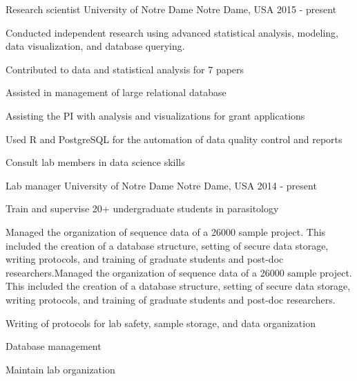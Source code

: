 
\begin{cventries}

  \cventry
    {Research scientist} %
    {University of Notre Dame} %
    {Notre Dame, USA} %
    {2015 - present} %
    {
      \begin{cvitems} %
        \item Conducted independent research using advanced statistical analysis, modeling, data visualization, and database querying. 
        \item Contributed to data and statistical analysis for 7 papers
        \item Assisted in management of large relational database
        \item Assisting the PI with analysis and visualizations for grant applications
        \item Used R and PostgreSQL for the automation of data quality control and reports
        \item Consult lab members in data science skills
      \end{cvitems}
    }

\cventry
    {Lab manager} %
    {University of Notre Dame} %
    {Notre Dame, USA} %
    {2014 - present} %
    {
      \begin{cvitems} %
   \item Train and supervise 20+ undergraduate students in parasitology
\item Managed the organization of sequence data of a 26000 sample project. This included the creation of a database structure, setting of secure data storage, writing protocols, and training of graduate students and post-doc researchers.Managed the organization of sequence data of a 26000 sample project. This included the creation of a database structure, setting of secure data storage, writing protocols, and training of graduate students and post-doc researchers.
\item Writing of protocols for lab safety, sample storage, and data organization
\item Database management
\item Maintain lab organization
      \end{cvitems}
    }


\end{cventries}
